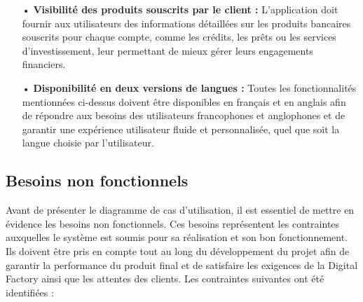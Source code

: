 \begin{itemize}
    \item[•] \textbf{Visibilité des produits souscrits par le client :} L'application doit fournir aux utilisateurs des informations détaillées sur les produits bancaires souscrits pour chaque compte, comme les crédits, les prêts ou les services d'investissement, leur permettant de mieux gérer leurs engagements financiers.
    \item[•] \textbf{Disponibilité en deux versions de langues :} Toutes les fonctionnalités mentionnées ci-dessus doivent être disponibles en français et en anglais afin de répondre aux besoins des utilisateurs francophones et anglophones et de garantir une expérience utilisateur fluide et personnalisée, quel que soit la langue choisie par l'utilisateur.
\end{itemize}

\subsection{Besoins non fonctionnels}
Avant de présenter le diagramme de cas d'utilisation, il est essentiel de mettre en évidence les besoins non fonctionnels. Ces besoins représentent les contraintes auxquelles le système est soumis pour sa réalisation et son bon fonctionnement. Ils doivent être pris en compte tout au long du développement du projet afin de garantir la performance du produit final et de satisfaire les exigences de la Digital Factory ainsi que les attentes des clients. Les contraintes suivantes ont été identifiées :


